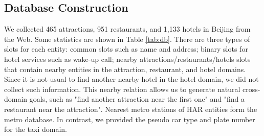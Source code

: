\begin{table}[b]
\centering
{}
\caption{Database statistics. $^*$ indicates that there are 37 binary slots for hotel services such as wake-up call. The last three rows show the average number of nearby attractions/restaurants/hotels for each entity. We did not collect nearby hotels information for the hotel domain.}
\label{tab:db}
\end{table}

\subsection{Database Construction}
We collected 465 attractions, 951 restaurants, and 1,133 hotels in Beijing from the Web. Some statistics are shown in Table \ref{tab:db}. There are three types of slots for each entity: common slots such as name and address; binary slots for hotel services such as wake-up call; nearby attractions/restaurants/hotels slots that contain nearby entities in the attraction, restaurant, and hotel domains. Since it is not usual to find another nearby hotel in the hotel domain, we did not collect such information. This nearby relation allows us to generate natural cross-domain goals, such as "find another attraction near the first one" and "find a restaurant near the attraction". Nearest metro stations of HAR entities form the metro database. In contrast, we provided the pseudo car type and plate number for the taxi domain. 

